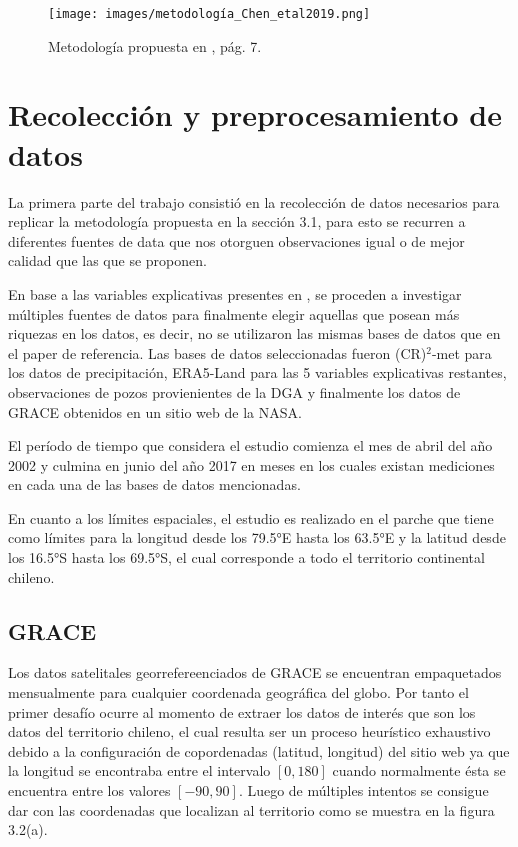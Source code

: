 \begin{figure}[ht]
    \centering
          \texttt{[image: images/metodología\_Chen\_etal2019.png]}
          \vskip -0.1in
    \caption[Metodología de reducción de dimensión propuesta]{\footnotesize Metodología propuesta en \cite{11}, pág. 7.}
    \label{metodologia}
\end{figure}


%
%
%
%
\section{Recolección y preprocesamiento de datos}


La primera parte del trabajo consistió en la recolección de datos necesarios para replicar la metodología
propuesta en la sección 3.1, para esto se recurren a diferentes fuentes de data que nos otorguen observaciones igual
o de mejor calidad que las que se proponen.

En base a las variables explicativas presentes en \cite{11}, se proceden a investigar múltiples fuentes de datos para finalmente
elegir aquellas que posean más riquezas en los datos, es decir, no se utilizaron las mismas bases de datos que en el paper de referencia. 
Las bases de datos seleccionadas fueron (CR)$^2$-met para los datos de precipitación, ERA5-Land para las 5 variables explicativas restantes,
observaciones de pozos provienientes de la DGA y finalmente los datos de GRACE obtenidos en un sitio web de la NASA.

El período de tiempo que considera el estudio comienza el mes de abril del año 2002 y culmina en junio del año 2017 en meses en los cuales existan mediciones en cada una
de las bases de datos mencionadas.

En cuanto a los límites espaciales, el estudio es realizado en el parche que tiene como límites para la longitud desde los 79.5°E hasta los 63.5°E y la latitud desde los 16.5°S hasta los
69.5°S, el cual corresponde a todo el territorio continental chileno.

    \subsection{GRACE}
    Los datos satelitales georrefereenciados de GRACE se encuentran empaquetados mensualmente
    para cualquier coordenada geográfica del globo. Por tanto el primer desafío ocurre al momento de extraer los datos de interés que son los datos 
    del territorio chileno, el cual resulta ser un proceso heurístico exhaustivo debido a la configuración de copordenadas (latitud, longitud) del sitio web
    ya que la longitud se encontraba entre el intervalo $[0,180]$ cuando normalmente ésta se encuentra entre los valores $[-90,90]$. Luego de múltiples intentos
    se consigue dar con las coordenadas que localizan al territorio como se muestra en la figura 3.2(a).
    
